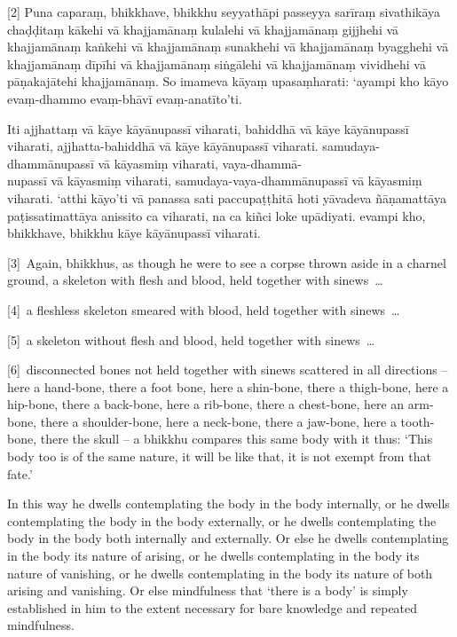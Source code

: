 [2] Puna caparaṃ, bhikkhave, bhikkhu seyyathāpi passeyya sarīraṃ sivathikāya
chaḍḍitaṃ kākehi vā khajjamānaṃ kulalehi vā khajjamānaṃ gijjhehi vā khajjamānaṃ
kaṅkehi vā khajjamānaṃ sunakhehi vā khajjamānaṃ byagghehi vā khajjamānaṃ dīpīhi
vā khajjamānaṃ siṅgālehi vā khajjamānaṃ vividhehi vā pāṇakajātehi khajjamānaṃ.
So imameva kāyaṃ upasaṃharati: ‘ayampi kho kāyo evaṃ-dhammo evaṃ-bhāvī
evaṃ-anatīto’ti.

Iti ajjhattaṃ vā kāye kāyānupassī viharati, bahiddhā vā kāye kāyānupassī
viharati, ajjhatta-bahiddhā vā kāye kāyānupassī viharati. samudaya-dhammānupassī
vā kāyasmiṃ viharati, vaya-dhammā-\\
nupassī vā kāyasmiṃ viharati, samudaya-vaya-dhammānupassī vā kāyasmiṃ viharati.
‘atthi kāyo’ti vā panassa sati paccupaṭṭhitā hoti yāvadeva ñāṇamattāya
paṭissatimattāya anissito ca viharati, na ca kiñci loke upādiyati. evampi kho,
bhikkhave, bhikkhu kāye kāyānupassī viharati.

\englishPage

[3]~Again, bhikkhus, as though he were to see a corpse thrown aside in a
charnel ground, a skeleton with flesh and blood, held together with sinews~\ldots{}

[4]~a fleshless skeleton smeared with blood, held together with sinews~\ldots{}

[5]~a skeleton without flesh and blood, held together with sinews~\ldots{}

[6]~disconnected bones not held together with sinews scattered in all directions
-- here a hand-bone, there a foot bone, here a shin-bone, there a thigh-bone,
here a hip-bone, there a back-bone, here a rib-bone, there a chest-bone, here an
arm-bone, there a shoulder-bone, here a neck-bone, there a jaw-bone, here a
tooth-bone, there the skull -- a bhikkhu compares this same body with it thus:
`This body too is of the same nature, it will be like that, it is not exempt
from that fate.'

In this way he dwells contemplating the body in the body internally, or he
dwells contemplating the body in the body externally, or he dwells contemplating
the body in the body both internally and externally. Or else he dwells
contemplating in the body its nature of arising, or he dwells contemplating in
the body its nature of vanishing, or he dwells contemplating in the body its
nature of both arising and vanishing. Or else mindfulness that ‘there is a body’
is simply established in him to the extent necessary for bare knowledge and
repeated mindfulness.

